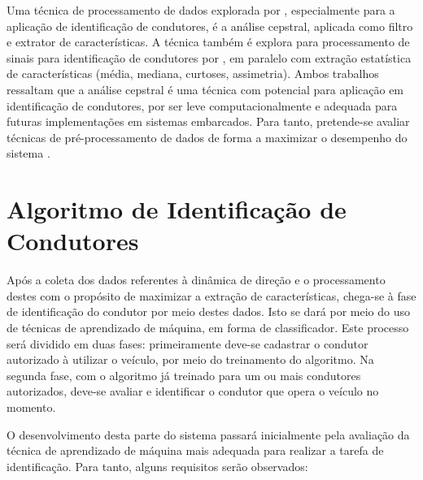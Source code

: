 Uma técnica de processamento de dados explorada por , especialmente para a aplicação de identificação de condutores, é a análise cepstral, aplicada como filtro e extrator de características. A técnica também é explora para processamento de sinais para identificação de condutores por , em paralelo com extração estatística de características (média, mediana, curtoses, assimetria). Ambos trabalhos ressaltam que a análise cepstral é uma técnica com potencial para aplicação em identificação de condutores, por ser leve computacionalmente e adequada para futuras implementações em sistemas embarcados. Para tanto, pretende-se avaliar técnicas de pré-processamento de dados de forma a maximizar o desempenho do sistema \cite{Ahmadi-Pour2017}.



\section{Algoritmo de Identificação de Condutores}

Após a coleta dos dados referentes à dinâmica de direção e o processamento destes com o propósito de maximizar a extração de características, chega-se à fase de identificação do condutor por meio destes dados. Isto se dará por meio do uso de técnicas de aprendizado de máquina, em forma de classificador. Este processo será dividido em duas fases: primeiramente deve-se cadastrar o condutor autorizado à utilizar o veículo, por meio do treinamento do algoritmo. Na segunda fase, com o algoritmo já treinado para um ou mais condutores autorizados, deve-se avaliar e identificar o condutor que opera o veículo no momento.

O desenvolvimento desta parte do sistema passará inicialmente pela avaliação da técnica de aprendizado de máquina mais adequada para realizar a tarefa de identificação. Para tanto, alguns requisitos serão observados:

